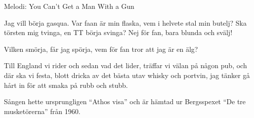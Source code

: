 \begin{song}

\begin{songmeta}
Melodi: You Can't Get a Man With a Gun
\end{songmeta}

\begin{songtext}
Jag vill börja gasqua. Var faan är min flaska,
vem i helvete stal min butelj?
Ska törsten mig tvinga, en TT börja svinga?
Nej för fan, bara blunda och svälj!

Vilken smörja, får jag spörja,
vem för fan tror att jag är en älg?

Till England vi rider och sedan vad det lider,
träffar vi välan på någon pub,
och där ska vi festa, blott dricka av det bästa
utav whisky och portvin, jag tänker gå hårt in
för att smaka på rubb och stubb.
\end{songtext}

\begin{songnotes}
Sången hette ursprungligen \textquotedblleft{}Athos visa\textquotedblright{} och är hämtad ur Bergsspexet \textquotedblleft{}De tre musketörerna\textquotedblright{} från 1960.
\end{songnotes}
\end{song}
